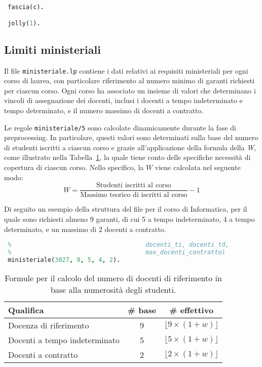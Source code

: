 \begin{lstlisting}[language=prolog, caption={Esempio struttura dati di \texttt{docenti\_a\_contratto.lp}.}]
 %  SEZIONE: FASCIE
 fascia(c).

 jolly(1).
\end{lstlisting}


\subsection{Limiti ministeriali}\label{sec:rules-ministeriale}

Il file \texttt{ministeriale.lp} contiene i dati relativi ai requisiti ministeriali per 
ogni corso di laurea, con particolare riferimento al numero minimo di garanti richiesti 
per ciascun corso. Ogni corso ha associato un insieme di valori che determinano i vincoli 
di assegnazione dei docenti, inclusi i docenti a tempo indeterminato e tempo determinato,
e il numero massimo di docenti a contratto.

Le regole \texttt{ministeriale/5} sono calcolate dinamicamente durante la fase di 
preprocessing. In particolare, questi valori sono determinati sulla base del numero di 
studenti iscritti a ciascun corso e grazie all'applicazione della formula della \textit{W}, 
come illustrato nella Tabella~\ref{tab:formula-w}, la quale tiene conto delle specifiche 
necessità di copertura di ciascun corso. Nello specifico, la $W$ viene calcolata nel 
seguente modo:
$$
W = \frac{
        \text{Studenti iscritti al corso}
    }
    {
        \text{Massimo teorico di iscritti al corso}
    }
    - 1
$$

Di seguito un esempio della struttura del file per il corso di Informatica, per 
il quale sono richiesti almeno 9 garanti, di cui 5 a tempo indeterminato, 4 a tempo 
determinato, e un massimo di 2 docenti a contratto. 

\begin{lstlisting}[language=prolog, caption={Esempio struttura dati di \texttt{ministeriale.lp}.}]    
 %  SEZIONE: Garanti minimi per corso (codice_corso, minimo_complessivo, 
 %                                     docenti_ti, docenti_td, 
 %                                     max_docenti_contratto)
 ministeriale(3027, 9, 5, 4, 2).
\end{lstlisting} 

\begin{table}[h]
    \centering
    \renewcommand{\arraystretch}{1.5}
    \begin{tabular}{|l|c|c|}
    \hline
    \textbf{Qualifica} & \textbf{\# base} & \textbf{\# effettivo} \\
    \hline
    Docenza di riferimento & 9 & $\lfloor 9 \times (1+w) \rfloor$ \\
    \hline
    Docenti a tempo indeterminato & 5 & $\lfloor 5 \times (1+w) \rfloor$ \\
    \hline
    Docenti a contratto & 2 & $\lfloor 2 \times (1+w) \rfloor$ \\
    \hline
    \end{tabular}
    \caption{Formule per il calcolo del numero di docenti di riferimento in base alla numerosità degli studenti.}
    \label{tab:formula-w}
\end{table}


